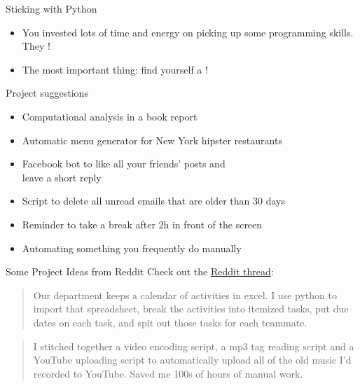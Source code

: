 \documentclass[xcolor={usenames,svgnames,x11names,dvipsnames,table}]{beamer}
\begin{document}
\begin{frame}{Sticking with Python}
    \begin{itemize}
        \item You invested lots of time and energy on picking up some programming skills.
              They !
        \item The most important thing: find yourself a !
    \end{itemize}

    \begin{block}{Project suggestions}
        \begin{itemize}
            \item Computational analysis in a book report
            \item Automatic menu generator for New York hipster restaurants
            \item Facebook bot to like all your friends' posts and\\
                  leave a short reply
            \item Script to delete all unread emails that are older than 30 days
            \item Reminder to take a break after 2h in front of the screen
            \item Automating something you frequently do manually
        \end{itemize}
    \end{block}
\end{frame}

\begin{frame}{Some Project Ideas from Reddit}
    Check out the \href{https://www.reddit.com/r/Python/comments/308ucq/how_do_you_use_python_to_automate_tasks_in_life/}{Reddit thread}:

    \medskip
    \pause
    \begin{quote}
        Our department keeps a calendar of activities in excel.
        I use python to import that spreadsheet, break the activities into itemized tasks, put due dates on each task, and spit out those tasks for each teammate.
    \end{quote}

    \pause
    \begin{quote}
        I stitched together a video encoding script, a mp3 tag reading script and a YouTube uploading script to automatically upload all of the old music I'd recorded to YouTube. Saved me 100s of hours of manual work. 
    \end{quote}
\end{frame}
\end{document}

